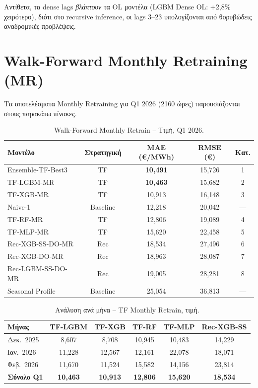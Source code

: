Αντίθετα, τα dense lags \textit{βλάπτουν} τα OL μοντέλα (LGBM Dense OL: +2,8\% χειρότερο),
διότι στο recursive inference, οι lags 3--23 υπολογίζονται από θορυβώδεις αναδρομικές προβλέψεις.


\section{Walk-Forward Monthly Retraining (MR)}
\label{sec:mr_results}

Τα αποτελέσματα Monthly Retraining για Q1 2026 (2160 ώρες) παρουσιάζονται στους παρακάτω πίνακες.

\begin{table}[H]
\centering
\caption{Walk-Forward Monthly Retrain -- Τιμή, Q1 2026.}
\label{tab:mr_price_q1}
\begin{tabular}{lcccc}
\toprule
\textbf{Μοντέλο} & \textbf{Στρατηγική} & \textbf{MAE (€/MWh)} & \textbf{RMSE (€)} & \textbf{Κατ.} \\
\midrule
Ensemble-TF-Best3 & TF & \textbf{10,491} & 15,726 & 1 \\
TF-LGBM-MR & TF & \textbf{10,463} & 15,682 & 2 \\
TF-XGB-MR & TF & 10,913 & 16,148 & 3 \\
Naive-1 & Baseline & 12,218 & 20,042 & --- \\
TF-RF-MR & TF & 12,806 & 19,089 & 4 \\
TF-MLP-MR & TF & 15,620 & 22,458 & 5 \\
Rec-XGB-SS-DO-MR & Rec & 18,534 & 27,496 & 6 \\
Rec-XGB-DO-MR & Rec & 18,963 & 28,087 & 7 \\
Rec-LGBM-SS-DO-MR & Rec & 19,005 & 28,281 & 8 \\
\midrule
Seasonal Profile & Baseline & 25,054 & 36,813 & --- \\
\bottomrule
\end{tabular}
\end{table}

\begin{table}[H]
\centering
\caption{Ανάλυση ανά μήνα -- TF Monthly Retrain, τιμή.}
\label{tab:mr_price_monthly}
\begin{tabular}{lccccc}
\toprule
\textbf{Μήνας} & \textbf{TF-LGBM} & \textbf{TF-XGB} & \textbf{TF-RF} & \textbf{TF-MLP} & \textbf{Rec-XGB-SS} \\
\midrule
Δεκ.\ 2025 & 8,607 & 8,708 & 10,945 & 10,483 & 14,229 \\
Ιαν.\ 2026 & 11,228 & 12,567 & 12,161 & 22,078 & 18,071 \\
Φεβ.\ 2026 & 11,670 & 11,524 & 15,582 & 14,156 & 23,814 \\
\textbf{Σύνολο Q1} & \textbf{10,463} & \textbf{10,913} & \textbf{12,806} & \textbf{15,620} & \textbf{18,534} \\
\bottomrule
\end{tabular}
\end{table}


